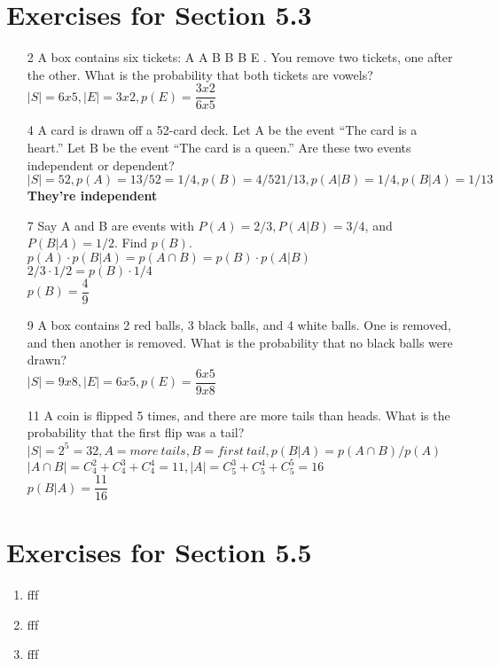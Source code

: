 \documentclass[12pt]{article}
\begin{document}
\section*{Exercises for Section 5.3}
\begin{enumerate}
    \item [2] A box contains six tickets: A A B B B E . You remove two tickets, one after the other. What is the probability that both tickets are vowels?\\
	$|S| = 6x5, |E| = 3x2, p(E) = \dfrac{3x2}{6x5}$
    \item [4] A card is drawn off a 52-card deck. Let A be the event “The card is a heart.” Let B be the event “The card is a queen.” Are these two events independent or dependent?\\
	$|S| = 52, p(A) = 13/52 = 1/4, p(B) = 4/52 1/13, p(A|B) = 1/4, p(B|A) = 1/13$\\
	\textbf{They're independent}
    \item [7] Say A and B are events with $P(A) = 2/3, P(A|B) = 3/4$, and $P(B|A) = 1/2$. Find $p(B)$.\\
	$p(A)\cdot p(B|A) = p(A\cap B) = p(B) \cdot p(A|B)$\\
	$2/3 \cdot 1/2 = p(B) \cdot 1/4$\\
	$p(B) = \dfrac{4}{9}$
    \item [9] A box contains 2 red balls, 3 black balls, and 4 white balls. One is removed, and then another is removed. What is the probability that no black balls were drawn?\\
	$|S| = 9x8, |E| = 6x5, p(E) = \dfrac{6x5}{9x8}$
    \item [11] A coin is flipped 5 times, and there are more tails than heads. What is the probability that the first flip was a tail?\\
	$|S| = 2^5 = 32, A = more\ tails, B = first\ tail, p(B|A) = p(A\cap B)/p(A)$\\
	$|A \cap B| = C_4^2 + C_4^3 + C_4^4 = 11, |A| = C_5^3 + C_5^4 + C_5^5 = 16$\\
	$p(B|A) = \dfrac{11}{16}$
\end{enumerate}
\section*{Exercises for Section 5.5}
\begin{enumerate}
    \item fff
    \item fff
    \item fff
\end{enumerate}
\end{document}
